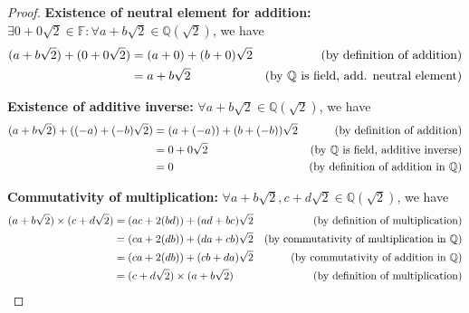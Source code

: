 \documentclass[10pt]{article}
\newcommand{\F}{\mathbb{F}}
\newcommand{\Q}{\mathbb{Q}}
\newenvironment{problem}[2][Problem]{\begin{trivlist}
\item[\hskip \labelsep {\bfseries #1}\hskip \labelsep {\bfseries #2.}]}{\end{trivlist}}
\begin{document}
\begin{problem}{4}
\begin{enumerate}
\begin{proof}
                \textbf{Existence of neutral element for addition:} \( \exists 0 + 0\sqrt{2} \in \F \colon \forall a + b\sqrt{2} \in \Q(\sqrt{2}) \), we have
                \begin{align*}
                    (a + b\sqrt{2}) + (0 + 0\sqrt{2}) &= (a + 0) + (b + 0)\sqrt{2} & \text{(by definition of addition)} \hfill \\
                                                      &= a + b\sqrt{2} & \text{(by $\Q$ is field, add. neutral element)} \hfill
                \end{align*}

                \textbf{Existence of additive inverse:} \( \forall a + b\sqrt{2} \in \Q(\sqrt{2}) \), we have
                \begin{align*}
                    (a + b\sqrt{2}) + ((-a) + (-b)\sqrt{2}) &= (a + (-a)) + (b + (-b))\sqrt{2} & \text{(by definition of addition)} \hfill \\
                                                      &= 0 + 0\sqrt{2} & \text{(by $\Q$ is field, additive inverse)} \hfill \\
                                                      &= 0 & \text{(by definition of addition in $\Q$)} \hfill
                \end{align*}

                \textbf{Commutativity of multiplication:} \( \forall a + b\sqrt{2}, c + d\sqrt{2} \in \Q(\sqrt{2}) \), we have
                \begin{align*}
                    (a + b\sqrt{2}) \times (c + d\sqrt{2}) &= (ac + 2(bd)) + (ad + bc)\sqrt{2} & \text{(by definition of multiplication)} \hfill \\
                                                          &= (ca + 2(db)) + (da + cb)\sqrt{2} & \text{(by commutativity of multiplication in $\Q$)} \hfill \\
                                                          &= (ca + 2(db)) + (cb + da)\sqrt{2} & \text{(by commutativity of addition in $\Q$)} \hfill \\
                                                          &= (c + d\sqrt{2}) \times (a + b\sqrt{2}) & \text{(by definition of multiplication)} \hfill
                \end{align*}


\end{proof}
\end{enumerate}
\end{problem}
\end{document}

